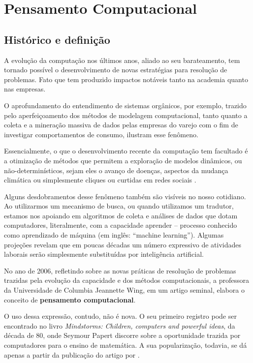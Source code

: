 \chapter{Pensamento Computacional}\label{pensamento-computacional}


\section{Histórico e definição}

A evolução da computação nos últimos anos, aliado ao seu barateamento, tem tornado possível o desenvolvimento de novas estratégias para resolução de problemas. Fato que tem produzido impactos notáveis tanto na academia quanto nas empresas.

O aprofundamento do entendimento de sistemas orgânicos, por exemplo, trazido pelo aperfeiçoamento dos métodos de modelagem computacional, tanto quanto a coleta e a mineração massiva de dados pelas empresas do varejo com o fim de investigar comportamentos de consumo, ilustram esse fenômeno.

Essencialmente, o que o desenvolvimento recente da computação tem facultado é a otimização de métodos que permitem a exploração de modelos dinâmicos, ou não-determinísticos, sejam eles o avanço de doenças, aspectos da mudança climática ou simplesmente cliques ou curtidas em redes sociais \cite{weintrop}.

Alguns desdobramentos desse fenômeno também são visíveis no nosso cotidiano. Ao utilizarmos um mecanismo de busca, ou quando utilizamos um tradutor, estamos nos apoiando em algoritmos de coleta e análises de dados que dotam computadores, literalmente, com a capacidade aprender -- processo conhecido como aprendizado de máquina (em inglês: ``machine learning''). Algumas projeções revelam que em poucas décadas um número expressivo de atividades laborais serão simplesmente substituídas por inteligência artificial. %

No ano de 2006, refletindo sobre as novas práticas de resolução de problemas trazidas pela evolução da capacidade e dos métodos computacionais, a professora da Universidade de Columbia Jeannette Wing, em um artigo seminal, elabora o conceito de \textbf{pensamento computacional}. 

O uso dessa expressão, contudo, não é nova. O seu primeiro registro pode ser encontrado no livro \textit{Mindstorms: Children, computers and powerful ideas}, da década de 80, onde Seymour Papert discorre sobre a oportunidade trazida por computadores para o ensino de matemática. A sua popularização, todavia, se dá apenas a partir da publicação do artigo por .

